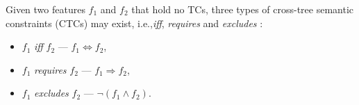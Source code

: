 Given two features $f_1$ and $f_2$ that hold no TCs, three types of cross-tree semantic constraints  (CTCs) may exist, i.e.,\emph{iff}, \emph{requires} and \emph{excludes} \cite{DBLP:conf/splc/Batory05}:

\begin{itemize}[itemindent=*]
\item $f_1$ \emph{iff} $f_2$ --- $f_1 \Leftrightarrow f_2$,
\item $f_1$ \emph{requires} $f_2$ --- $f_1 \Rightarrow f_2$,
\item $f_1$ \emph{excludes} $f_2$ --- $\neg(f_1 \wedge f_2)$.
\end{itemize}

%
%
%
%
%

